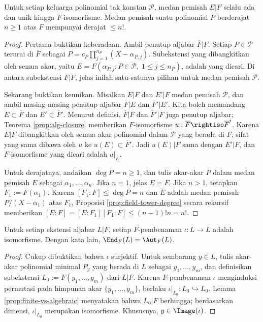 \begin{proposition}
	Untuk setiap keluarga polinomial tak konstan $\mathcal{P}$, medan pemisah $E|F$ selalu ada dan unik hingga $F$-isomorfisme. Medan pemisah suatu polinomial $P$ berderajat $n \geq 1$ atas $F$ mempunyai derajat $ \leq n!$.
\end{proposition}
\begin{proof}
	Pertama buktikan keberadaan. Ambil penutup aljabar $\overline{F}|F$. Setiap $P \in \mathcal{P}$ terurai di $\overline{F}$ sebagai $P = c_P \prod_{j=1}^{n_P}(X - \alpha_{P,j})$. Subekstensi yang dibangkitkan oleh semua akar, yaitu $E = F\left( \alpha_{P,j} : P \in \mathcal{P},\; 1 \leq j \leq n_P \right)$, adalah yang dicari. Di antara subekstensi $\overline{F}|F$, jelas inilah satu-satunya pilihan untuk medan pemisah $\mathcal{P}$.

	Sekarang buktikan keunikan. Misalkan $E|F$ dan $E'|F$ medan pemisah $\mathcal{P}$, dan ambil masing-masing penutup aljabar $\overline{F}|E$ dan $\overline{F}'|E'$. Kita boleh memandang $E \subset \overline{F}$ dan $E' \subset \overline{F}'$. Menurut definisi, $\overline{F}|F$ dan $\overline{F}'|F$ juga penutup aljabar; Teorema \ref{prop:alg-closure} memberikan $F$-isomorfisme $u: \overline{F} \rightiso \overline{F}'$. Karena $E|F$ dibangkitkan oleh semua akar polinomial dalam $\mathcal{P}$ yang berada di $\overline{F}$, sifat yang sama dibawa oleh $u$ ke $u(E) \subset \overline{F}'$. Jadi $u(E)|F$ sama dengan $E'|F$, dan $F$-isomorfisme yang dicari adalah $u|_E$.

	Untuk derajatnya, andaikan $\deg P = n \geq 1$, dan tulis akar-akar $P$ dalam medan pemisah $E$ sebagai $\alpha_1, \ldots, \alpha_n$. Jika $n=1$, jelas $E=F$. Jika $n>1$, tetapkan $F_1 := F(\alpha_1)$. Karena $[F_1:F] \leq \deg P = n$ dan $E$ adalah medan pemisah $P/(X-\alpha_1)$ atas $F_1$, Proposisi \ref{prop:field-tower-degree} secara rekursif memberikan $[E:F] = [E:F_1][F_1:F] \leq (n-1)! n = n!$.
\end{proof}

\begin{lemma}\label{prop:alg-ext-endomorphism}
	Untuk setiap ekstensi aljabar $L|F$, setiap $F$-pembenaman $\iota: L \to L$ adalah isomorfisme. Dengan kata lain, $\End_F(L)=\Aut_F(L)$.
\end{lemma}
\begin{proof}
	Cukup dibuktikan bahwa $\iota$ surjektif. Untuk sembarang $y \in L$, tulis akar-akar polinomial minimal $P_y$ yang berada di $L$ sebagai $y_1, \ldots, y_m$, dan definisikan subekstensi $L_0 := F(y_1, \ldots, y_m)$ dari $L|F$. Karena $F$-pembenaman $\iota$ menginduksi permutasi pada himpunan akar $\{y_1, \ldots, y_m\}$, berlaku $\iota|_{L_0}: L_0 \hookrightarrow L_0$. Lemma \ref{prop:finite-vs-algebraic} menyatakan bahwa $L_0|F$ berhingga; berdasarkan dimensi, $\iota|_{L_0}$ merupakan isomorfisme. Khususnya, $y \in \Image(\iota)$.
\end{proof}

